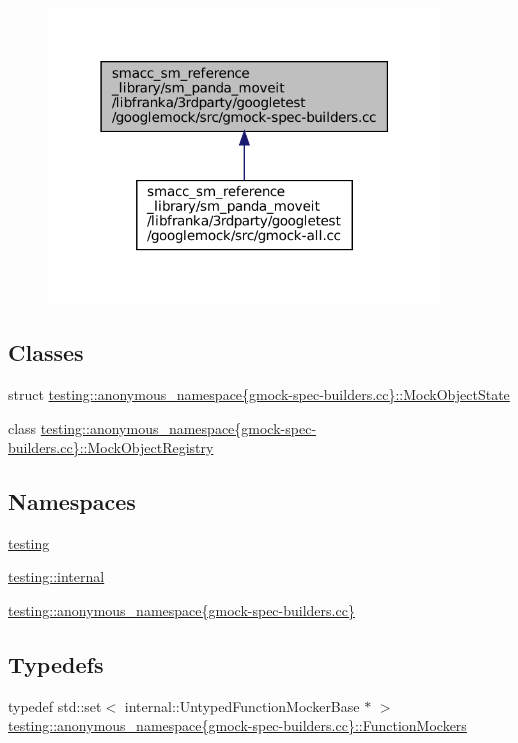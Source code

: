 \begin{figure}[H]
\begin{center}
\leavevmode
\includegraphics[width=295pt]{gmock-spec-builders_8cc__dep__incl}
\end{center}
\end{figure}
\subsection*{Classes}
\begin{DoxyCompactItemize}
\item 
struct \hyperlink{structtesting_1_1anonymous__namespace_02gmock-spec-builders_8cc_03_1_1MockObjectState}{testing\+::anonymous\+\_\+namespace\{gmock-\/spec-\/builders.\+cc\}\+::\+Mock\+Object\+State}
\item 
class \hyperlink{classtesting_1_1anonymous__namespace_02gmock-spec-builders_8cc_03_1_1MockObjectRegistry}{testing\+::anonymous\+\_\+namespace\{gmock-\/spec-\/builders.\+cc\}\+::\+Mock\+Object\+Registry}
\end{DoxyCompactItemize}
\subsection*{Namespaces}
\begin{DoxyCompactItemize}
\item 
 \hyperlink{namespacetesting}{testing}
\item 
 \hyperlink{namespacetesting_1_1internal}{testing\+::internal}
\item 
 \hyperlink{namespacetesting_1_1anonymous__namespace_02gmock-spec-builders_8cc_03}{testing\+::anonymous\+\_\+namespace\{gmock-\/spec-\/builders.\+cc\}}
\end{DoxyCompactItemize}
\subsection*{Typedefs}
\begin{DoxyCompactItemize}
\item 
typedef std\+::set$<$ internal\+::\+Untyped\+Function\+Mocker\+Base $\ast$ $>$ \hyperlink{namespacetesting_1_1anonymous__namespace_02gmock-spec-builders_8cc_03_abf8c9e1e1f8466bdd16e9f399af53be3}{testing\+::anonymous\+\_\+namespace\{gmock-\/spec-\/builders.\+cc\}\+::\+Function\+Mockers}
\end{DoxyCompactItemize}
